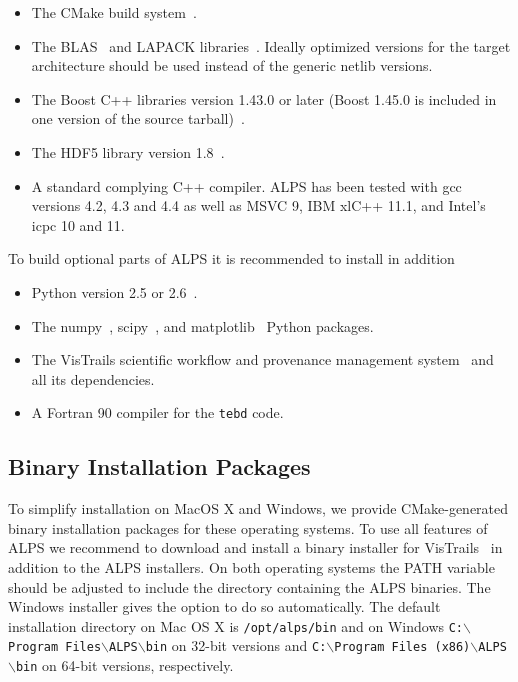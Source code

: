 \documentclass[12pt]{iopart}
\begin{document}
\begin{itemize}
\item The CMake build system~\cite{cmake}.
\item The BLAS~\cite{blasnetlib} and LAPACK libraries~\cite{lapack}. Ideally optimized versions for the target architecture should be used instead of the generic netlib versions.
\item The Boost C++ libraries version 1.43.0 or later (Boost 1.45.0 is included in one version of the source tarball)~\cite{boost}.
\item The HDF5 library version 1.8~\cite{hdf5}.
\item A standard complying C++ compiler. ALPS has been tested with gcc versions 4.2, 4.3 and 4.4 as well as MSVC 9, IBM xlC++ 11.1, and Intel's icpc 10 and 11.
\end{itemize}
To build optional parts of ALPS it is recommended to install in addition
\begin{itemize}
\item Python version 2.5 or 2.6~\cite{python}.
\item The numpy~\cite{numpy}, scipy~\cite{scipy}, and matplotlib~\cite{matplotlib} Python packages.
\item The VisTrails scientific workflow and provenance management system~\cite{vistrails} and all its dependencies.
\item A Fortran 90 compiler for the {\tt tebd} code.
\end{itemize}

\subsection{Binary Installation Packages}

To simplify installation on MacOS X and Windows, we provide CMake-generated binary installation packages for these operating systems. To use all features of ALPS we recommend to download and install a binary installer for VisTrails~\cite{vistrails} in addition to the ALPS installers. On both operating systems the PATH variable should be adjusted to include the directory containing the ALPS binaries. The Windows installer gives the option to do so automatically. The default installation directory on Mac OS X is {\tt /opt/alps/bin} and on Windows {\tt C:$\backslash$Program Files$\backslash$ALPS$\backslash$bin} on 32-bit versions and  {\tt C:$\backslash$Program Files (x86)$\backslash$ALPS$\backslash$bin} on 64-bit versions, respectively.
\end{document}
